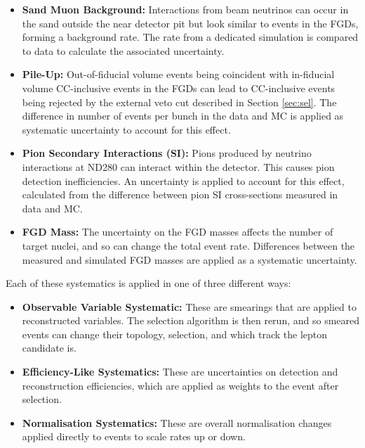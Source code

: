 \begin{itemize}
\item \textbf{Sand Muon Background:} Interactions from beam neutrinos can occur in the sand outside the near detector pit but look similar to events in the FGDs, forming a background rate. The rate from a dedicated simulation is compared to data to calculate the associated uncertainty.

\item \textbf{Pile-Up:} Out-of-fiducial volume events being coincident with in-fiducial volume CC-inclusive events in the FGDs can lead to CC-inclusive events being rejected by the external veto cut described in Section \ref{sec:sel}. The difference in number of events per bunch in the data and MC is applied as systematic uncertainty to account for this effect.

\item \textbf{Pion Secondary Interactions (SI):} Pions produced by neutrino interactions at ND280 can interact within the detector. This causes pion detection inefficiencies. An uncertainty is applied to account for this effect, calculated from the difference between pion SI cross-sections measured in data and MC.

\item \textbf{FGD Mass:} The uncertainty on the FGD masses affects the number of target nuclei, and so can change the total event rate. Differences between the measured and simulated FGD masses are applied as a systematic uncertainty.

\end{itemize}

Each of these systematics is applied in one of three different ways:

\begin{itemize}

\item \textbf{Observable Variable Systematic:} These are smearings that are applied to reconstructed variables. The selection algorithm is then rerun, and so smeared events can change their topology, selection, and which track the lepton candidate is.

\item \textbf{Efficiency-Like Systematics:} These are uncertainties on detection and reconstruction efficiencies, which are applied as weights to the event after selection.

\item \textbf{Normalisation Systematics:} These are overall normalisation changes applied directly to events to scale rates up or down.

\end{itemize}

